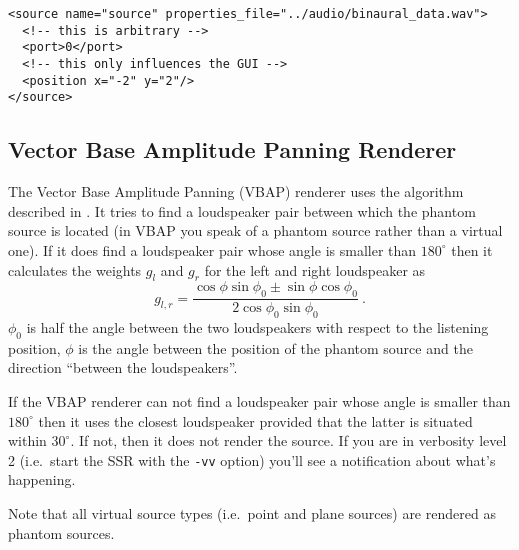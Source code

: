 \begin{verbatim}
<source name="source" properties_file="../audio/binaural_data.wav">
  <!-- this is arbitrary -->
  <port>0</port>
  <!-- this only influences the GUI -->
  <position x="-2" y="2"/>
</source>
\end{verbatim}


\subsection{Vector Base Amplitude Panning Renderer}

The Vector Base Amplitude Panning (VBAP) renderer uses
the algorithm described in
\cite{Pulkki97:JAES}. It tries to find a loudspeaker pair between
which the phantom source is located (in VBAP you speak of a phantom
source rather than a virtual one). If it does find a loudspeaker pair
whose angle is smaller than $180^\circ$ then it calculates the weights
$g_l$ and $g_r$ for
the left and right loudspeaker as
%
\begin{equation}
g_{l,r} = \frac{\cos\phi \sin \phi_0 \pm \sin \phi \cos \phi_0}
{2\cos \phi_0 \sin \phi_0} \ . \nonumber
\end{equation}
%
$\phi_0$ is half the angle between the two loudspeakers with respect to the
listening position, $\phi$ is the angle between the position of the phantom
source and the direction ``between the loudspeakers''.

If the VBAP renderer can not find a loudspeaker pair whose angle is smaller
than $180^\circ$ then it uses the closest loudspeaker provided that the latter
is situated within $30^\circ$. If not, then it does not render the source. If
you are in verbosity level 2 (i.e.~start the SSR with the \texttt{-vv} option)
you'll see a notification about what's happening.

Note that all virtual source types (i.e.~point and plane sources) are rendered
as phantom sources.

